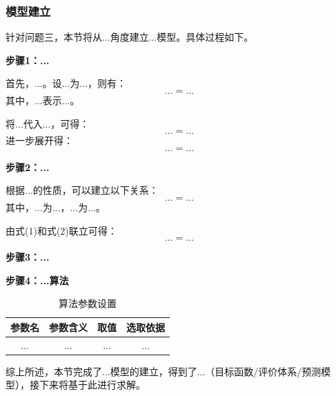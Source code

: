 
\subsubsection{模型建立}

针对问题三，本节将从...角度建立...模型。具体过程如下。

\textbf{步骤1：...}

首先，...。设...为...，则有：
\begin{equation}
    ... = ...
\end{equation}
其中，$...$表示...。

将...代入...，可得：
\begin{equation}
    ... = ...
\end{equation}
进一步展开得：
\begin{equation}
    ... = ...
\end{equation}

\textbf{步骤2：...}

根据...的性质，可以建立以下关系：
\begin{equation}
    ... = ...
\end{equation}
其中，$...$为...，$...$为...。

由式(1)和式(2)联立可得：
\begin{equation}
    ... = ...
\end{equation}

\textbf{步骤3：...}


\textbf{步骤4：...算法}


\begin{table}[H]
  \centering
  \caption{算法参数设置}
  \begin{tabularx}{\textwidth}{CCCC}
    \toprule
    参数名 & 参数含义 & 取值 & 选取依据 \\
    \midrule
    ... & ... & ... & ... \\
    \bottomrule
  \end{tabularx}
  \label{tab:参数3}
\end{table}

综上所述，本节完成了...模型的建立，得到了...（目标函数/评价体系/预测模型），接下来将基于此进行求解。

